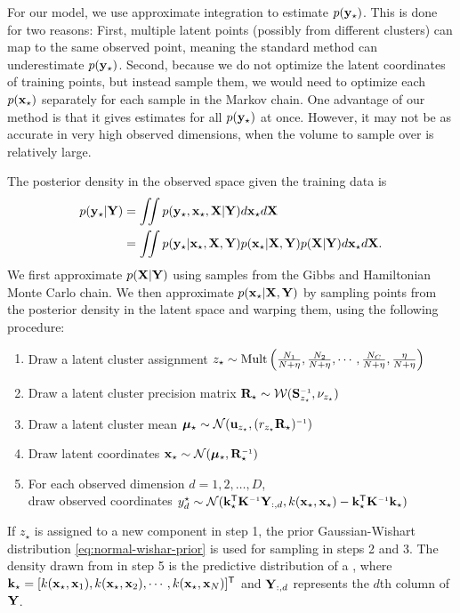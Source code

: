 For our model, we use approximate integration to estimate $p({\bf{y}}_\star)$.
This is done for two reasons:
First, multiple latent points (possibly from different clusters) can map to the same observed point, meaning the standard method can underestimate $p({\bf{y}}_\star)$.
Second, because we do not optimize the latent coordinates of training points, but instead sample them, we would need to optimize each $p({\bf{x}}_\star)$ separately for each sample in the Markov chain.
One advantage of our method is that it gives estimates for all $p({\bf{y}}_\star)$ at once.
However, it may not be as accurate in very high observed dimensions, when the volume to sample over is relatively large.

The posterior density in the observed space given the training data is
%
\begin{align}
p({\bf{y}}_\star | \mathbf{Y})
& = \int \!\!\! \int p({\bf{y}}_\star,{\bf{x}}_\star, \mathbf{X} | \mathbf{Y})d{\bf{x}}_\star d\mathbf{X} \nonumber\\
& = \int\!\!\! \int p({\bf{y}}_\star | {\bf{x}}_\star, \mathbf{X}, \mathbf{Y})p({\bf{x}}_\star|\mathbf{X},\mathbf{Y})p(\mathbf{X}|\mathbf{Y})d{\bf{x}}_\star d\mathbf{X}.
\label{eq:density}
\end{align}
%
We first approximate $p(\mathbf{X} | \mathbf{Y})$ using samples from the Gibbs and Hamiltonian Monte Carlo chain.
We then approximate $p({\bf{x}}_\star | \mathbf{X}, \mathbf{Y})$ by sampling points from the posterior density in the latent space and warping them, using the following procedure:
%
\begin{enumerate}
\item Draw a latent cluster assignment $z_\star \sim {\rm Mult} \left( \frac{N_{1}}{N+\eta}, \frac{N_{2}}{N+\eta}, \cdots,\frac{N_{C}}{N+\eta},\frac{\eta}{N+\eta} \right)$
\item Draw a latent cluster precision matrix $\vR_\star \sim {\cal W}(\vS\inv_{z_\star},\nu_{z_\star})$
\item Draw a latent cluster mean $\vmu_\star \sim {\cal N}(\vu_{z_\star},(r_{z_\star}\vR_\star)\inv)$
\item Draw latent coordinates $\vx_\star \sim {\cal N}(\vmu_\star,\vR_\star\inv)$
\item For each observed dimension $d = 1, 2, \ldots, D$, \\ draw observed coordinates 
$y^\star_d \sim {\cal N}(\vk_\star\tra \vK\inv \vY_{:,d}, k(\vx_\star,\vx_\star) - \vk_\star\tra \vK\inv \vk_\star)$
\end{enumerate}
%
If $z_\star$ is assigned to a new component in step 1, the prior Gaussian-Wishart distribution \eqref{eq:normal-wishar-prior} is used for sampling in steps 2 and 3.
The density drawn from in step 5 is the predictive distribution of a \gp{}, where
%
${\bf{k}}_\star=[ k({\bf{x}}_\star, {\bf{x}}_1), k({\bf{x}}_\star, {\bf{x}}_2), \cdots, k({\bf{x}}_\star, {\bf{x}}_N)]^{\mathsf{T}}$ and $\mathbf{Y}_{:,d}$ represents the $d$th column of $\mathbf{Y}$.

